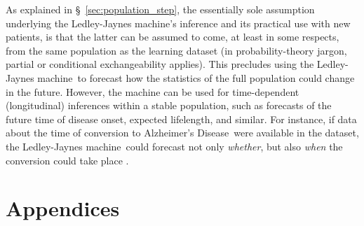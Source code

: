 \documentclass[utf8]{FrontiersinHarvard} %
\newcommand*{\sect}{\S}%
\newcommand*{\eg}{{e.g.}}
\newcommand*{\cf}{{cf.}}
\renewcommand*{\|}[1][]{\nonscript\:#1\vert\nonscript\:\mathopen{}}
\newcommand*{\ad}{Alzheimer's Disease}
\newcommand*{\mci}{Mild Cognitive Impairment}
\newcommand*{\ljm}{Ledley-Jaynes machine}
\newcommand*{\adni}{\textsc{adni}}
\begin{document}
As explained in \sect~\ref{sec:population_step}, the essentially sole assumption underlying the \ljm's inference and its practical use with new patients, is that the latter can be assumed to come, at least in some respects, from the same population as the learning dataset (in probability-theory jargon, partial or conditional exchangeability applies). This precludes using the \ljm\ to forecast how the statistics of the full population could change in the future. However, the machine can be used for time-dependent (longitudinal) inferences within a stable population, such as forecasts of the future time of disease onset, expected lifelength, and similar. For instance, if data about the time of conversion to \ad\ were available in the dataset, the \ljm\ could forecast not only \emph{whether}, but also \emph{when} the conversion could take place \citep[\cf\ \eg][]{delacruzmesiaetal2007}.


\bigskip%
\appendix
\renewcommand\thesection{\Alph{section}}
\section{Appendices}
\label{sec:appendices}



\end{document}

